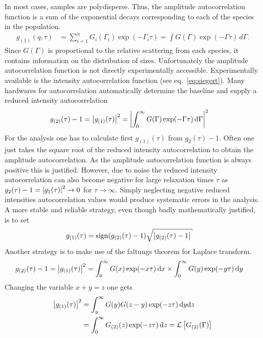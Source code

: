 In most cases, samples are polydisperse. Thus, the amplitude autocorrelation function is a sum of the exponential decays corresponding to each of the species in the population.
\begin{align}
    g_{(1)}(q,\tau) &= \sum_{i=1}^n G_i(\Gamma_i)\exp(-\Gamma_i\tau) = \int G(\Gamma)\exp(-\Gamma\tau)\,d\Gamma.
\end{align}
 Since $G(\Gamma)$ is proportional to the relative scattering from each species, it contains information on the distribution of sizes. Unfortunately the amplitude autocorrelation function is not directly experimentally accessible. Experimentally available is the intensity autocorrelation function (see eq.\ \ref{eq:siegert}). Many hardwares for autocorrelation automatically determine the baseline and supply a reduced intensity autocorrelation
 \begin{align}
 g_{(2)}(\tau)-1 &=\abs{g_{(1)}(\tau)}^2 = \abs{\int_0^\infty G(\Gamma) \exp(-\Gamma\tau)\,\mathrm{d}\Gamma}^2
 \end{align}
 For the analysis one has to calculate first $g_{(1)}(\tau)$ from $g_2(\tau)-1$. Often one just takes the square root of the reduced intensity autocorrelation to obtain the amplitude autocorrelation. As the amplitude autocorrelation function is always positive this is justified. However, due to noise the reduced intensity autocorrelation can also become negative for large relaxation times $\tau$ as $g_2(\tau)-1=\abs{g_1(\tau)}^2 \rightarrow 0$ for $\tau\rightarrow\infty$. Simply neglecting negative reduced intensities autocorrelation values would produce systematic errors in the analysis. A more stable and reliable strategy, even though badly mathematically justified, is to set
\begin{align}
\label{eq:sqrt_g2m1}
 g_{(1)}(\tau) &= \mathrm{sign}(g_{(2)}(\tau)-1) \sqrt{\abs{g_{(2)}(\tau)-1}}
\end{align}
Another strategy is to make use of the faltungs theorem for Laplace transform.
\begin{align}\label{eq:Lg2}
 g_{(2)}(\tau)-1 &=\abs{g_{(1)}(\tau)}^2 = \int_0^\infty G(x) \exp(-x\tau)\,\mathrm{d}x \times \int_0^\infty G(y) \exp(-y\tau)\,\mathrm{d}y
 \end{align}
 Changing the variable $x+y=z$ one gets
\begin{align}
 \abs{g_{(1)}(\tau)}^2 &= \int_y^\infty G(y) G(z-y)\exp(-z\tau)\,\mathrm{d}y\mathrm{d}z \\
                   &= \int_0^\infty G_{(2)}(z) \exp(-z\tau)\,\mathrm{d}z = \mathcal{L}\left[G_{(2)}(\Gamma)\right]
 \end{align}

